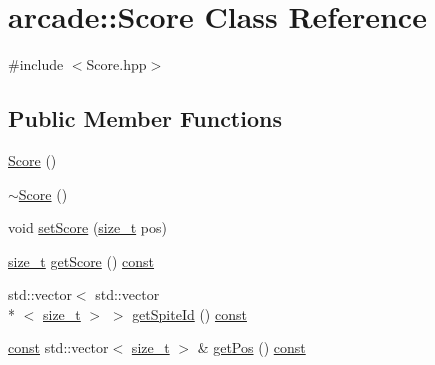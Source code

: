 \hypertarget{classarcade_1_1_score}{\section{arcade\-:\-:Score Class Reference}
\label{classarcade_1_1_score}
}


{\ttfamily \#include $<$Score.\-hpp$>$}

\subsection*{Public Member Functions}
\begin{DoxyCompactItemize}
\item 
\hyperlink{classarcade_1_1_score_a31a9d14385212121cd36ac0ec1b9d194}{Score} ()
\item 
\hyperlink{classarcade_1_1_score_a2e53e8bdd8612f1373a000e7f14fe4b6}{$\sim$\-Score} ()
\item 
void \hyperlink{classarcade_1_1_score_ab1a4350450a786efaefce8b84c7a4bbc}{set\-Score} (\hyperlink{nc__alloc_8h_a7b60c5629e55e8ec87a4547dd4abced4}{size\-\_\-t} pos)
\item 
\hyperlink{nc__alloc_8h_a7b60c5629e55e8ec87a4547dd4abced4}{size\-\_\-t} \hyperlink{classarcade_1_1_score_a4dee6542bd621cac9c3cc0d5ff1d0081}{get\-Score} () \hyperlink{term__entry_8h_a57bd63ce7f9a353488880e3de6692d5a}{const} 
\item 
std\-::vector$<$ std\-::vector\\*
$<$ \hyperlink{nc__alloc_8h_a7b60c5629e55e8ec87a4547dd4abced4}{size\-\_\-t} $>$ $>$ \hyperlink{classarcade_1_1_score_a9c58f29da3ae6c8d0e1761e726cfc60b}{get\-Spite\-Id} () \hyperlink{term__entry_8h_a57bd63ce7f9a353488880e3de6692d5a}{const} 
\item 
\hyperlink{term__entry_8h_a57bd63ce7f9a353488880e3de6692d5a}{const} std\-::vector$<$ \hyperlink{nc__alloc_8h_a7b60c5629e55e8ec87a4547dd4abced4}{size\-\_\-t} $>$ \& \hyperlink{classarcade_1_1_score_a37cb0f96260022488c754fa80ebceef7}{get\-Pos} () \hyperlink{term__entry_8h_a57bd63ce7f9a353488880e3de6692d5a}{const} 
\end{DoxyCompactItemize}


